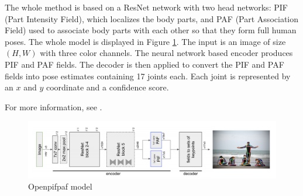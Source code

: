 The whole method is based on a ResNet \cite{resnet} network with two head networks: PIF (Part Intensity Field), which localizes the body parts, and PAF (Part Association Field) used to associate body parts with each other so that they form full human poses. The whole model is displayed in Figure \ref{fig:pifpaf}. The input is an image of size $(H, W)$ with three color channels. The neural network based encoder produces PIF and PAF fields. The decoder is then applied to convert the PIF and PAF fields into pose estimates containing 17 joints each. Each joint is represented by an $x$ and $y$ coordinate and a confidence score.

For more information, see \cite{openPifPaf_paper}.

\begin{figure}[h!]
    \centering
    \includegraphics[scale=0.22]{figures/PifPafModel.png}
    \caption{Openpifpaf model \cite{openPifPaf_paper}}
    \label{fig:pifpaf}
\end{figure}

